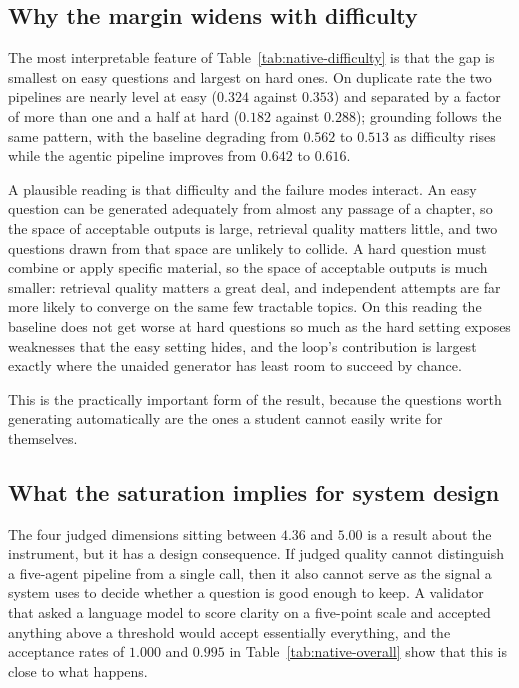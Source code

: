 \subsection{Why the margin widens with difficulty}

The most interpretable feature of Table~\ref{tab:native-difficulty} is that the
gap is smallest on easy questions and largest on hard ones. On duplicate rate the
two pipelines are nearly level at easy ($0.324$ against $0.353$) and separated by
a factor of more than one and a half at hard ($0.182$ against $0.288$); grounding
follows the same pattern, with the baseline degrading from $0.562$ to $0.513$ as
difficulty rises while the agentic pipeline improves from $0.642$ to $0.616$.

A plausible reading is that difficulty and the failure modes interact. An easy
question can be generated adequately from almost any passage of a chapter, so
the space of acceptable outputs is large, retrieval quality matters little, and
two questions drawn from that space are unlikely to collide. A hard question must
combine or apply specific material, so the space of acceptable outputs is much
smaller: retrieval quality matters a great deal, and independent attempts are far
more likely to converge on the same few tractable topics. On this reading the
baseline does not get worse at hard questions so much as the hard setting exposes
weaknesses that the easy setting hides, and the loop's contribution is largest
exactly where the unaided generator has least room to succeed by chance.

This is the practically important form of the result, because the questions worth
generating automatically are the ones a student cannot easily write for
themselves.

\subsection{What the saturation implies for system design}

The four judged dimensions sitting between $4.36$ and $5.00$ is a result about
the instrument, but it has a design consequence. If judged quality cannot
distinguish a five-agent pipeline from a single call, then it also cannot serve
as the signal a system uses to decide whether a question is good enough to keep.
A validator that asked a language model to score clarity on a five-point scale
and accepted anything above a threshold would accept essentially everything, and
the acceptance rates of $1.000$ and $0.995$ in
Table~\ref{tab:native-overall} show that this is close to what happens.

